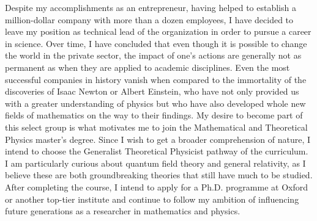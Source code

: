\documentclass[10pt]{article}
\begin{document}
Despite my accomplishments as an entrepreneur, having helped to establish a million-dollar company with more than a dozen employees, I have decided to leave my position as technical lead of the organization in order to pursue a career in science. Over time, I have concluded that even though it is possible to change the world in the private sector, the impact of one's actions are generally not as permanent as when they are applied to academic disciplines. Even the most successful companies in history vanish when compared to the immortality of the discoveries of Isaac Newton or Albert Einstein, who have not only provided us with a greater understanding of physics but who have also developed whole new fields of mathematics on the way to their findings. My desire to become part of this select group is what motivates me to join the Mathematical and Theoretical Physics master's degree. Since I wish to get a broader comprehension of nature, I intend to choose the Generalist Theoretical Physicist pathway of the curriculum. I am particularly curious about quantum field theory and general relativity, as I believe these are both groundbreaking theories that still have much to be studied. After completing the course, I intend to apply for a Ph.D. programme at Oxford or another top-tier institute and continue to follow my ambition of influencing future generations as a researcher in mathematics and physics.
\end{document}

